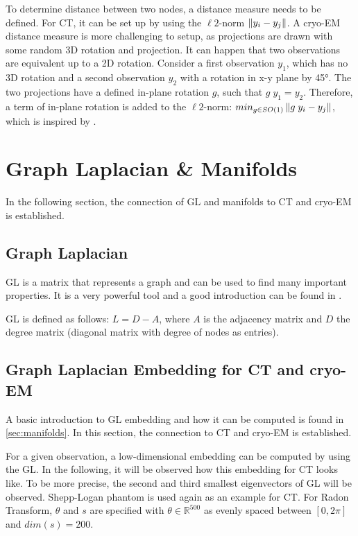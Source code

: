 To determine distance between two nodes, a distance measure needs to be defined.
For CT, it can be set up by using the $\ell2$-norm $\left\lVert y_i - y_j\right\rVert$.
A cryo-EM distance measure is more challenging to setup, as projections are drawn with some random 3D rotation and projection.
It can happen that two observations are equivalent up to a 2D rotation. 
Consider a first observation $y_1$, which has no 3D rotation and 
a second observation $y_2$ with a rotation in x-y plane by 45°.
The two projections have a defined in-plane rotation $g$, such that $g \; y_1 = y_2$.
Therefore, a term of in-plane rotation is added to the $\ell2$-norm: $min_{g \in SO(1)}\left\lVert g \;y_i - y_j\right\rVert$, 
which is inspired by \cite{multiDiffusionMaps}.


\section{Graph Laplacian \& Manifolds}
In the following section, the connection of GL and manifolds to CT and cryo-EM is established.

\subsection{Graph Laplacian}
GL is a matrix that represents a graph and can be used to find many important properties.
It is a very powerful tool and a good introduction can be found in \cite{tutorialSpectralClustering, SpectralGraphTheory}. 

GL is defined as follows: $L = D - A$, where $A$ is the adjacency matrix and $D$ the degree matrix (diagonal matrix with degree of nodes as entries).

\subsection{Graph Laplacian Embedding for CT and cryo-EM}
A basic introduction to GL embedding and how it can be computed is found in \ref{sec:manifolds}.
In this section, the connection to CT and cryo-EM is established.

For a given observation, a low-dimensional embedding can be computed by using the GL.
In the following, it will be observed how this embedding for CT looks like.
To be more precise, the second and third smallest eigenvectors of GL will be observed.
Shepp-Logan phantom is used again as an example for CT.
For Radon Transform, $\theta$ and $s$ are specified with $\theta \in \mathbb{R}^{500}$ as evenly spaced
between $[0, 2 \pi]$ and $dim(s) = 200$. 

